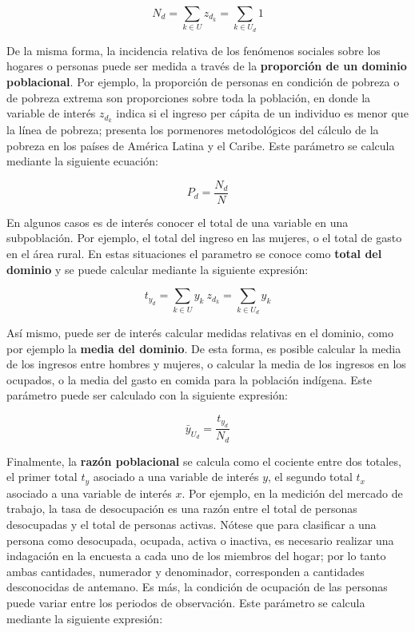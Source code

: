 \documentclass[
  12pt,
  spanish,
]{book}
\begin{document}
\[N_d = \sum_{k \in U}z_{d_k} = \sum_{k \in U_d}1\]

De la misma forma, la incidencia relativa de los fenómenos sociales sobre los hogares o personas puede ser medida a través de la \textbf{proporción de un dominio poblacional}. Por ejemplo, la proporción de personas en condición de pobreza o de pobreza extrema son proporciones sobre toda la población, en donde la variable de interés \(z_{d_k}\) indica si el ingreso per cápita de un individuo es menor que la línea de pobreza; \citet{CEPAL_2018} presenta los pormenores metodológicos del cálculo de la pobreza en los países de América Latina y el Caribe. Este parámetro se calcula mediante la siguiente ecuación:

\[P_d=\frac{N_d}{N}\]

En algunos casos es de interés conocer el total de una variable en una subpoblación. Por ejemplo, el total del ingreso en las mujeres, o el total de gasto en el área rural. En estas situaciones el parametro se conoce como \textbf{total del dominio} y se puede calcular mediante la siguiente expresión:

\[t_{y_d} = \sum_{k \in U}y_{k} \ z_{d_k} = \sum_{k \in U_d}y_{k}\]

Así mismo, puede ser de interés calcular medidas relativas en el dominio, como por ejemplo la \textbf{media del dominio}. De esta forma, es posible calcular la media de los ingresos entre hombres y mujeres, o calcular la media de los ingresos en los ocupados, o la media del gasto en comida para la población indígena. Este parámetro puede ser calculado con la siguiente expresión:

\[\bar y_{U_d} = \frac{t_{y_d}}{N_d}\]

Finalmente, la \textbf{razón poblacional} se calcula como el cociente entre dos totales, el primer total \(t_y\) asociado a una variable de interés \(y\), el segundo total \(t_x\) asociado a una variable de interés \(x\). Por ejemplo, en la medición del mercado de trabajo, la tasa de desocupación es una razón entre el total de personas desocupadas y el total de personas activas. Nótese que para clasificar a una persona como desocupada, ocupada, activa o inactiva, es necesario realizar una indagación en la encuesta a cada uno de los miembros del hogar; por lo tanto ambas cantidades, numerador y denominador, corresponden a cantidades desconocidas de antemano. Es más, la condición de ocupación de las personas puede variar entre los periodos de observación. Este parámetro se calcula mediante la siguiente expresión:
\end{document}
